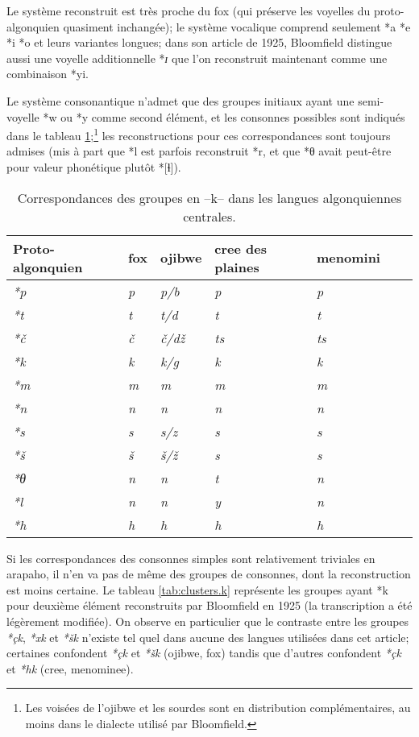 \documentclass[twoside,a4paper,11pt]{article}
\newcommand{\ipa}[1]{{\phon\textit{#1}}}
\newcommand{\Σ}{\greek{Σ}}
\begin{document}
Le système reconstruit est très proche du fox (qui préserve les voyelles du proto-algonquien quasiment inchangée); le système vocalique comprend seulement *a *e *i *o et leurs variantes longues; dans son article de 1925, Bloomfield distingue aussi une voyelle additionnelle *\ipa{ɪ} que l'on reconstruit maintenant comme une combinaison *yi.

Le système consonantique n'admet que des groupes initiaux ayant une semi-voyelle *w ou *y comme second élément, et les consonnes possibles sont indiqués dans le tableau \ref{tab:c.simple};\footnote{Les voisées de l'ojibwe et les sourdes sont en distribution complémentaires, au moins dans le dialecte utilisé par Bloomfield.} les reconstructions pour ces correspondances sont toujours admises (mis à part que *l est parfois reconstruit *r, et que *θ avait peut-être pour valeur phonétique plutôt *[ɬ]).

\begin{table}[H]
\caption{Correspondances des groupes en --k-- dans les langues algonquiennes centrales.} \centering  \label{tab:c.simple}
\begin{tabular}{lllllll}
\toprule
Proto-algonquien & fox & ojibwe & cree des plaines & menomini \\
\midrule
\ipa{*p} & 	\ipa{p} & 	\ipa{p/b} & 	\ipa{p} & 	\ipa{p} & 	\\
\ipa{*t} & 	\ipa{t} & 	\ipa{t/d} & 	\ipa{t} & 	\ipa{t} & 	\\
\ipa{*č} & 	\ipa{č} & 	\ipa{č/dž} & 	\ipa{ts} & 	\ipa{ts} & 	\\
\ipa{*k} & 	\ipa{k} & 	\ipa{k/g} & 	\ipa{k} & 	\ipa{k} & 	\\
\ipa{*m} & 	\ipa{m} & 	\ipa{m} & 	\ipa{m} & 	\ipa{m} & 	\\
\ipa{*n} & 	\ipa{n} & 	\ipa{n} & 	\ipa{n} & 	\ipa{n} & 	\\
\ipa{*s} & 	\ipa{s} & 	\ipa{s/z} & 	\ipa{s} & 	\ipa{s} & 	\\
\ipa{*š} & 	\ipa{š} & 	\ipa{š/ž} & 	\ipa{s} & 	\ipa{s} & 	\\
\ipa{*θ} & 	\ipa{n} & 	\ipa{n} & 	\ipa{t} & 	\ipa{n} & 	\\
\ipa{*l} & 	\ipa{n} & 	\ipa{n} & 	\ipa{y} & 	\ipa{n} & 	\\
\ipa{*h} & 	\ipa{h} & 	\ipa{h} & 	\ipa{h} & 	\ipa{h} & 	\\
\bottomrule
\end{tabular}
\end{table}

Si les correspondances des consonnes simples sont relativement triviales en arapaho, il n'en va pas de même des groupes de consonnes, dont la reconstruction est moins certaine. Le tableau \ref{tab:clusters.k} représente les groupes ayant *k pour deuxième élément reconstruits par Bloomfield en 1925 (la transcription a été légèrement modifiée). On observe en particulier que le contraste entre les  groupes  \ipa{*çk}, \ipa{*xk} et \ipa{*šk} n'existe tel quel dans aucune des langues utilisées dans cet article; certaines confondent \ipa{*çk}  et \ipa{*šk} (ojibwe, fox) tandis que d'autres confondent \ipa{*çk}  et \ipa{*hk} (cree, menominee).
 
\end{document}
